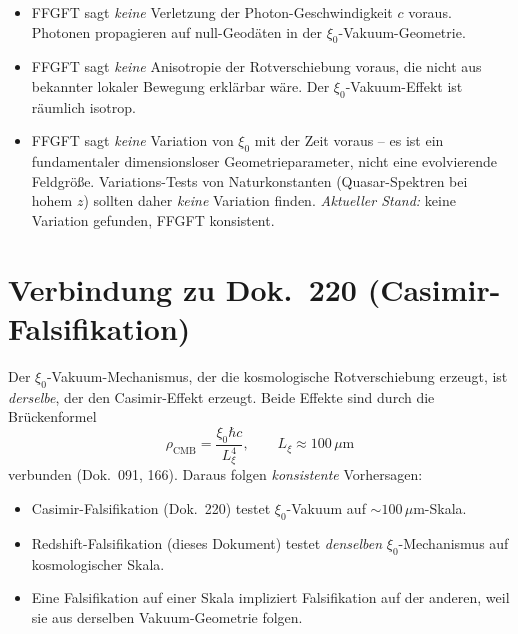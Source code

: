 \begin{itemize}[leftmargin=2em,itemsep=2pt,topsep=2pt]
  \item FFGFT sagt \emph{keine} Verletzung der Photon-Geschwindigkeit
        $c$ voraus. Photonen propagieren auf null-Geodäten in der
        $\xi_0$-Vakuum-Geometrie.
  \item FFGFT sagt \emph{keine} Anisotropie der Rotverschiebung
        voraus, die nicht aus bekannter lokaler Bewegung erklärbar
        wäre. Der $\xi_0$-Vakuum-Effekt ist räumlich isotrop.
  \item FFGFT sagt \emph{keine} Variation von $\xi_0$ mit der Zeit
        voraus -- es ist ein fundamentaler dimensionsloser
        Geometrieparameter, nicht eine evolvierende Feldgröße.
        Variations-Tests von Naturkonstanten (Quasar-Spektren bei
        hohem $z$) sollten daher \emph{keine} Variation finden.
        \emph{Aktueller Stand:} keine Variation gefunden, FFGFT
        konsistent.
\end{itemize}

\section{Verbindung zu Dok.~220 (Casimir-Falsifikation)}

Der $\xi_0$-Vakuum-Mechanismus, der die kosmologische Rotverschiebung
erzeugt, ist \emph{derselbe}, der den Casimir-Effekt erzeugt. Beide
Effekte sind durch die Brückenformel
\begin{equation}
  \rho_\text{CMB} = \frac{\xi_0 \hbar c}{L_\xi^4},
  \qquad
  L_\xi \approx 100\,\mu\text{m}
\end{equation}
verbunden (Dok.~091, 166). Daraus folgen \emph{konsistente}
Vorhersagen:

\begin{itemize}[leftmargin=2em,itemsep=2pt,topsep=2pt]
  \item Casimir-Falsifikation (Dok.~220) testet
        $\xi_0$-Vakuum auf $\sim 100\,\mu$m-Skala.
  \item Redshift-Falsifikation (dieses Dokument) testet
        \emph{denselben} $\xi_0$-Mechanismus auf kosmologischer Skala.
  \item Eine Falsifikation auf einer Skala impliziert
        Falsifikation auf der anderen, weil sie aus derselben
        Vakuum-Geometrie folgen.
\end{itemize}

